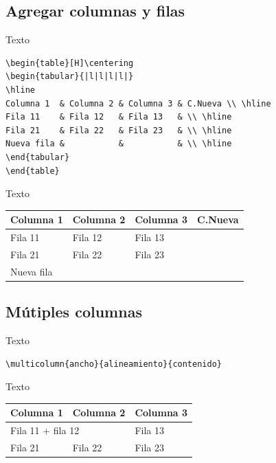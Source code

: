 \documentclass[letterpaper, 10pt, journal]{IEEEtran}
\begin{document}
\subsection{Agregar columnas y filas}

Texto
\lstset{language=Java}
\begin{lstlisting}
\begin{table}[H]\centering
\begin{tabular}{|l|l|l|l|}
\hline
Columna 1  & Columna 2 & Columna 3 & C.Nueva \\ \hline
Fila 11    & Fila 12   & Fila 13   & \\ \hline
Fila 21    & Fila 22   & Fila 23   & \\ \hline
Nueva fila &           &           & \\ \hline
\end{tabular}
\end{table}
\end{lstlisting}

Texto
\begin{table}[H]\centering
\begin{tabular}{|l|l|l|l|}
\hline
Columna 1  & Columna 2 & Columna 3 & C.Nueva \\ \hline
Fila 11    & Fila 12   & Fila 13   & \\ \hline
Fila 21    & Fila 22   & Fila 23   & \\ \hline
Nueva fila &           &           & \\ \hline
\end{tabular}
\end{table}

\subsection{M\'utiples columnas}

Texto

\lstset{language=Java}
\begin{lstlisting}
\multicolumn{ancho}{alineamiento}{contenido}
\end{lstlisting}

Texto 
\begin{table}[H]\centering
\begin{tabular}{|l|l|l|}
\hline
Columna 1 & Columna 2  & Columna 3 \\ \hline
\multicolumn{2}{|l|}{Fila 11 + fila 12} & Fila 13 \\ \hline
Fila 21   & Fila 22    & Fila 23   \\ \hline
\end{tabular}
\end{table}
\end{document}
